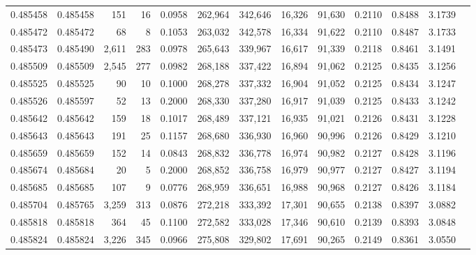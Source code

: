 \begin{tabular}{rrrrrrrrrrrrr}
0.485458 & 0.485458 &   151 &    16 &                                     0.0958 & 262,964 & 342,646 &  16,326 &  91,630 & 0.2110 & 0.8488 & 3.1739 \\
0.485472 & 0.485472 &    68 &     8 &                                     0.1053 & 263,032 & 342,578 &  16,334 &  91,622 & 0.2110 & 0.8487 & 3.1733 \\
0.485473 & 0.485490 & 2,611 &   283 &                                     0.0978 & 265,643 & 339,967 &  16,617 &  91,339 & 0.2118 & 0.8461 & 3.1491 \\
0.485509 & 0.485509 & 2,545 &   277 &                                     0.0982 & 268,188 & 337,422 &  16,894 &  91,062 & 0.2125 & 0.8435 & 3.1256 \\
0.485525 & 0.485525 &    90 &    10 &                                     0.1000 & 268,278 & 337,332 &  16,904 &  91,052 & 0.2125 & 0.8434 & 3.1247 \\
0.485526 & 0.485597 &    52 &    13 &                                     0.2000 & 268,330 & 337,280 &  16,917 &  91,039 & 0.2125 & 0.8433 & 3.1242 \\
0.485642 & 0.485642 &   159 &    18 &                                     0.1017 & 268,489 & 337,121 &  16,935 &  91,021 & 0.2126 & 0.8431 & 3.1228 \\
0.485643 & 0.485643 &   191 &    25 &                                     0.1157 & 268,680 & 336,930 &  16,960 &  90,996 & 0.2126 & 0.8429 & 3.1210 \\
0.485659 & 0.485659 &   152 &    14 &                                     0.0843 & 268,832 & 336,778 &  16,974 &  90,982 & 0.2127 & 0.8428 & 3.1196 \\
0.485674 & 0.485684 &    20 &     5 &                                     0.2000 & 268,852 & 336,758 &  16,979 &  90,977 & 0.2127 & 0.8427 & 3.1194 \\
0.485685 & 0.485685 &   107 &     9 &                                     0.0776 & 268,959 & 336,651 &  16,988 &  90,968 & 0.2127 & 0.8426 & 3.1184 \\
0.485704 & 0.485765 & 3,259 &   313 &                                     0.0876 & 272,218 & 333,392 &  17,301 &  90,655 & 0.2138 & 0.8397 & 3.0882 \\
0.485818 & 0.485818 &   364 &    45 &                                     0.1100 & 272,582 & 333,028 &  17,346 &  90,610 & 0.2139 & 0.8393 & 3.0848 \\
0.485824 & 0.485824 & 3,226 &   345 &                                     0.0966 & 275,808 & 329,802 &  17,691 &  90,265 & 0.2149 & 0.8361 & 3.0550 \\

\end{tabular}
